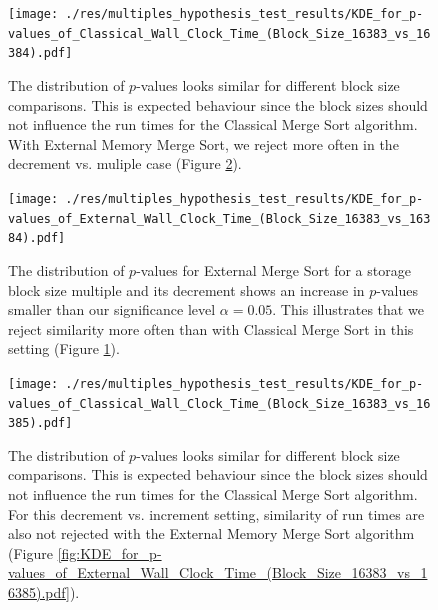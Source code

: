 \documentclass[twocolumn]{article}
\begin{document}
\begin{figure}[htb]
    \begin{minipage}{0.475 \textwidth}
        \centering
        \texttt{[image: ./res/multiples\_hypothesis\_test\_results/KDE\_for\_p-values\_of\_Classical\_Wall\_Clock\_Time\_(Block\_Size\_16383\_vs\_16384).pdf]}
        \caption{The distribution of \( p \)-values looks similar for different block size comparisons. This is expected behaviour since the block sizes should not influence the run times for the Classical Merge
            Sort algorithm. With External Memory Merge Sort, we reject more often in the decrement vs. muliple case (Figure \ref{fig:KDE_for_p-values_of_External_Wall_Clock_Time_(Block_Size_16383_vs_16384).pdf}).}
        \label{fig:KDE_for_p-values_of_Classical_Wall_Clock_Time_(Block_Size_16383_vs_16384).pdf}
    \end{minipage}
\end{figure}

\begin{figure}[htb]
    \begin{minipage}{0.475 \textwidth}
        \centering
        \texttt{[image: ./res/multiples\_hypothesis\_test\_results/KDE\_for\_p-values\_of\_External\_Wall\_Clock\_Time\_(Block\_Size\_16383\_vs\_16384).pdf]}
        \caption{The distribution of \( p \)-values for External Merge Sort for a storage block size multiple and its decrement shows an increase in \( p \)-values smaller than
            our significance level \( \alpha = 0.05 \). This illustrates that we reject similarity more often than with Classical Merge Sort in this setting
            (Figure \ref{fig:KDE_for_p-values_of_Classical_Wall_Clock_Time_(Block_Size_16383_vs_16384).pdf}).}
        \label{fig:KDE_for_p-values_of_External_Wall_Clock_Time_(Block_Size_16383_vs_16384).pdf}
    \end{minipage}
\end{figure}

\begin{figure}[htb]
    \begin{minipage}{0.475 \textwidth}
        \centering
        \texttt{[image: ./res/multiples\_hypothesis\_test\_results/KDE\_for\_p-values\_of\_Classical\_Wall\_Clock\_Time\_(Block\_Size\_16383\_vs\_16385).pdf]}
        \caption{The distribution of \( p \)-values looks similar for different block size comparisons. This is expected behaviour since the block sizes should not influence the run times for the Classical Merge
            Sort algorithm. For this decrement vs. increment setting, similarity of run times are also not rejected with the External Memory Merge Sort algorithm
            (Figure \ref{fig:KDE_for_p-values_of_External_Wall_Clock_Time_(Block_Size_16383_vs_16385).pdf}).}
        \label{fig:KDE_for_p-values_of_Classical_Wall_Clock_Time_(Block_Size_16383_vs_16385).pdf}
    \end{minipage}
\end{figure}
\end{document}
